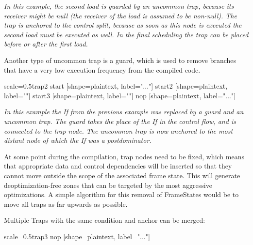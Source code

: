 \documentclass[twocolumn]{svjour3}
\begin{document}
\emph{\small In this example, the second load is guarded by an uncommon trap, because its receiver might be null (the receiver of the load is assumed to be non-null).
The trap is anchored to the control split, because as soon as this node is executed the second load must be executed as well.
In the final scheduling the trap can be placed before or after the first load.}

Another type of uncommon trap is a guard, which is used to remove branches that have a very low execution frequency from the compiled code.

\begin{digraphenv}{scale=0.5}{trap2}
    start [shape=plaintext, label="..."]
    start2 [shape=plaintext, label=""]
    start3 [shape=plaintext, label=""]
    nop [shape=plaintext, label="..."]
\end{digraphenv}


\emph{\small In this example the If from the previous example was replaced by a guard and an uncommon trap.
The guard takes the place of the If in the control flow, and is connected to the trap node.
The uncommon trap is now anchored to the most distant node of which the If was a postdominator.}

At some point during the compilation, trap nodes need to be fixed, which means that appropriate data and control dependencies will be inserted so that they cannot move outside the scope of the associated frame state.
This will generate deoptimization-free zones that can be targeted by the most aggressive optimizations.
A simple algorithm for this removal of FrameStates would be to move all traps as far upwards as possible.


Multiple Traps with the same condition and anchor can be merged:

\begin{digraphenv}{scale=0.5}{trap3}
    nop [shape=plaintext, label="..."]
\end{digraphenv}
\end{document}
